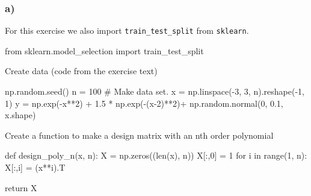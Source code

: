 \documentclass[
  letterpaper,
  DIV=11,
  numbers=noendperiod]{scrartcl}
\newenvironment{Shaded}{\begin{snugshade}}{\end{snugshade}}
\newcommand{\BuiltInTok}[1]{\textcolor[rgb]{0.00,0.23,0.31}{#1}}
\newcommand{\CommentTok}[1]{\textcolor[rgb]{0.37,0.37,0.37}{#1}}
\newcommand{\ControlFlowTok}[1]{\textcolor[rgb]{0.00,0.23,0.31}{#1}}
\newcommand{\DecValTok}[1]{\textcolor[rgb]{0.68,0.00,0.00}{#1}}
\newcommand{\FloatTok}[1]{\textcolor[rgb]{0.68,0.00,0.00}{#1}}
\newcommand{\ImportTok}[1]{\textcolor[rgb]{0.00,0.46,0.62}{#1}}
\newcommand{\KeywordTok}[1]{\textcolor[rgb]{0.00,0.23,0.31}{#1}}
\newcommand{\NormalTok}[1]{\textcolor[rgb]{0.00,0.23,0.31}{#1}}
\newcommand{\OperatorTok}[1]{\textcolor[rgb]{0.37,0.37,0.37}{#1}}
\begin{document}
\hypertarget{a}{%
\subsubsection{a)}\label{a}}

For this exercise we also import \texttt{train\_test\_split} from
\texttt{sklearn}.

\begin{Shaded}
\begin{Highlighting}[]
\ImportTok{from}\NormalTok{ sklearn.model\_selection }\ImportTok{import}\NormalTok{ train\_test\_split}
\end{Highlighting}
\end{Shaded}

Create data (code from the exercise text)

\begin{Shaded}
\begin{Highlighting}[]
\NormalTok{np.random.seed()}
\NormalTok{n }\OperatorTok{=} \DecValTok{100}
\CommentTok{\# Make data set.}
\NormalTok{x }\OperatorTok{=}\NormalTok{ np.linspace(}\OperatorTok{{-}}\DecValTok{3}\NormalTok{, }\DecValTok{3}\NormalTok{, n).reshape(}\OperatorTok{{-}}\DecValTok{1}\NormalTok{, }\DecValTok{1}\NormalTok{)}
\NormalTok{y }\OperatorTok{=}\NormalTok{ np.exp(}\OperatorTok{{-}}\NormalTok{x}\OperatorTok{**}\DecValTok{2}\NormalTok{) }\OperatorTok{+} \FloatTok{1.5} \OperatorTok{*}\NormalTok{ np.exp(}\OperatorTok{{-}}\NormalTok{(x}\OperatorTok{{-}}\DecValTok{2}\NormalTok{)}\OperatorTok{**}\DecValTok{2}\NormalTok{)}\OperatorTok{+}\NormalTok{ np.random.normal(}\DecValTok{0}\NormalTok{, }\FloatTok{0.1}\NormalTok{, x.shape)}
\end{Highlighting}
\end{Shaded}

Create a function to make a design matrix with an nth order polynomial

\begin{Shaded}
\begin{Highlighting}[]
\KeywordTok{def}\NormalTok{ design\_poly\_n(x, n):}
\NormalTok{    X }\OperatorTok{=}\NormalTok{ np.zeros((}\BuiltInTok{len}\NormalTok{(x), n))}
\NormalTok{    X[:,}\DecValTok{0}\NormalTok{] }\OperatorTok{=} \DecValTok{1}
    \ControlFlowTok{for}\NormalTok{ i }\KeywordTok{in} \BuiltInTok{range}\NormalTok{(}\DecValTok{1}\NormalTok{, n):}
\NormalTok{        X[:,i] }\OperatorTok{=}\NormalTok{ (x}\OperatorTok{**}\NormalTok{i).T}

    \ControlFlowTok{return}\NormalTok{ X}
\end{Highlighting}
\end{Shaded}
\end{document}
